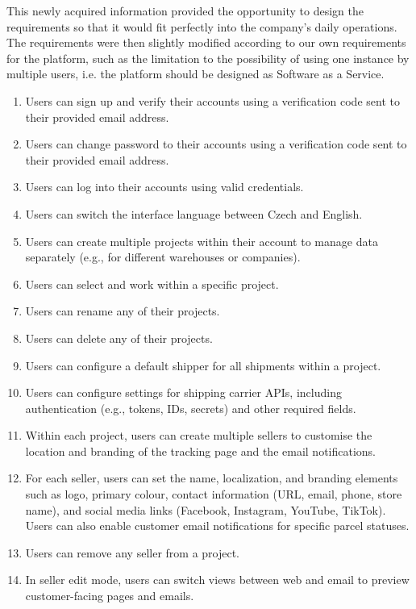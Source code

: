 This newly acquired information provided the opportunity to design the requirements so that it would fit perfectly into the company's daily operations. 
The requirements were then slightly modified according to our own requirements for the platform, such as the limitation to the possibility of using one instance by multiple users, i.e. the platform should be designed as Software as a Service.

\begin{enumerate}[label=\bfseries FR\arabic*:]
    \item Users can sign up and verify their accounts using a verification code sent to their provided email address.
    \item Users can change password to their accounts using a verification code sent to their provided email address.
    \item Users can log into their accounts using valid credentials.
    \item Users can switch the interface language between Czech and English.
    \item Users can create multiple projects within their account to manage data separately (e.g., for different warehouses or companies).
    \item Users can select and work within a specific project.
    \item Users can rename any of their projects.
    \item Users can delete any of their projects.
    \item Users can configure a default shipper for all shipments within a project.
    \item Users can configure settings for shipping carrier APIs, including authentication (e.g., tokens, IDs, secrets) and other required fields.
    \item Within each project, users can create multiple sellers to customise the location and branding of the tracking page and the email notifications.
    \item For each seller, users can set the name, localization, and branding elements such as logo, primary colour, contact information (URL, email, phone, store name), and social media links (Facebook, Instagram, YouTube, TikTok). Users can also enable customer email notifications for specific parcel statuses.
    \item Users can remove any seller from a project.
    \item In seller edit mode, users can switch views between web and email to preview customer-facing pages and emails.

\end{enumerate}
